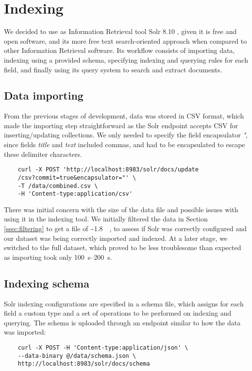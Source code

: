 \documentclass[sigconf, authorversion]{acmart}
\begin{document}
\section{Indexing}
We decided to use as Information Retrieval tool Solr 8.10 \cite{solrDocs}, given it is free and open software, and its more free text search-oriented approach when compared to other Information Retrieval software. Its workflow consists of importing data, indexing using a provided schema, specifying indexing and querying rules for each field, and finally using its query system to search and extract documents.

\subsection{Data importing} \label{ssec:data-importing}
From the previous stages of development, data was stored in CSV format, which made the importing step straightforward as the Solr endpoint accepts CSV for inserting/updating collections. We only needed to specify the field encapsulator \textit{"}, since fields \textit{title} and \textit{text} included commas, and had to be encapsulated to escape these delimiter characters.
\begin{verbatim} 
    curl -X POST 'http://localhost:8983/solr/docs/update
    /csv?commit=true&encapsulator="' \
    -T /data/combined.csv \
    -H 'Content-type:application/csv'
\end{verbatim}

There was initial concern with the size of the data file and possible issues with using it in the indexing tool. We initially filtered the data in Section \ref{ssec:filtering} to get a file of \textasciitilde\SI{1.8}{\mega\byte}, to assess if Solr was correctly configured and our dataset was being correctly imported and indexed. At a later stage, we switched to the full dataset, which proved to be less troublesome than expected as importing took only \SIrange{100}{200}{\second}.

\subsection{Indexing schema}
Solr indexing configurations are specified in a schema file, which assigns for each field a custom type and a set of operations to be performed on indexing and querying. The schema is uploaded through an endpoint similar to how the data was imported:
\begin{verbatim}
    curl -X POST -H 'Content-type:application/json' \
    --data-binary @/data/schema.json \
    http://localhost:8983/solr/docs/schema
\end{verbatim}
\end{document}
